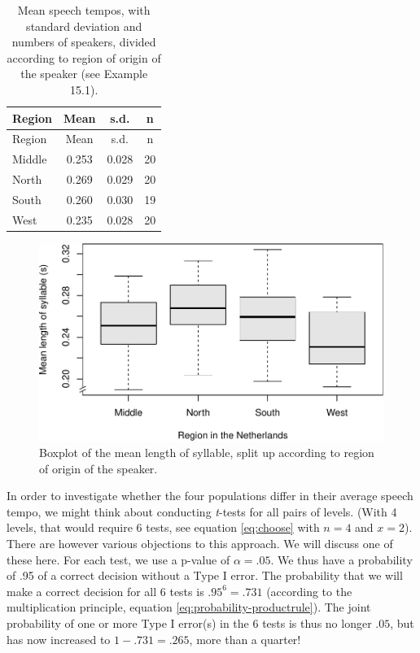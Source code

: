 \documentclass[
]{book}
\begin{document}
\begin{longtable}[]{@{}lccc@{}}
\caption{\label{tab:sylduration} Mean speech tempos, with standard deviation and numbers
of speakers, divided according to region of origin of the speaker (see Example
15.1).}\tabularnewline
\toprule
Region & Mean & s.d. & n\tabularnewline
\midrule
\endfirsthead
\toprule
Region & Mean & s.d. & n\tabularnewline
\midrule
\endhead
Middle & 0.253 & 0.028 & 20\tabularnewline
North & 0.269 & 0.029 & 20\tabularnewline
South & 0.260 & 0.030 & 19\tabularnewline
West & 0.235 & 0.028 & 20\tabularnewline
\bottomrule
\end{longtable}

\begin{figure}
\centering
\includegraphics{QMS-EN_files/figure-latex/sylduration-boxplot-1.pdf}
\caption{\label{fig:sylduration-boxplot}Boxplot of the mean length of syllable, split up according to region of origin of the speaker.}
\end{figure}

In order to investigate whether the four populations differ in their average
speech tempo, we might think about conducting \emph{t}-tests for all pairs
of levels. (With 4 levels, that would require 6 tests, see
equation \eqref{eq:choose} with \(n=4\) and \(x=2\)). There are however various
objections to this approach. We will discuss one of these here. For
each test, we use a p-value of \(\alpha=.05\).
We thus have a probability of .95 of a correct decision without a Type I error.
The probability that we will make a correct decision for all 6 tests is
\(.95^6 = .731\) (according to the multiplication principle,
equation \eqref{eq:probability-productrule}).
The joint probability of one or more
Type I error(s) in the 6 tests is thus no longer \(.05\), but has now
increased to \(1-.731 = .265\), more than a quarter!
\end{document}
